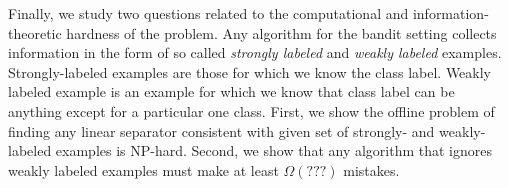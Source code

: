 \documentclass[12pt]{article}
\begin{document}
Finally, we study two questions related to the computational and
information-theoretic hardness of the problem. Any algorithm for the bandit
setting collects information in the form of so called \emph{strongly labeled}
and \emph{weakly labeled} examples. Strongly-labeled examples are those for
which we know the class label. Weakly labeled example is an example for which we
know that class label can be anything except for a particular one class. First,
we show the offline problem of finding any linear separator consistent with
given set of strongly- and weakly-labeled examples is NP-hard. Second, we show
that any algorithm that ignores weakly labeled examples must make at least
$\Omega(???)$ mistakes.



\end{document}
